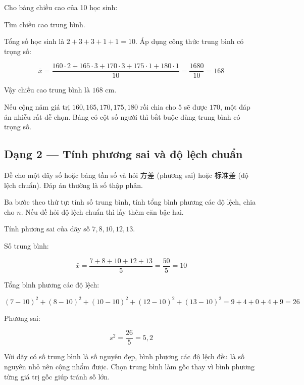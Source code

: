 \documentclass[11pt, a4paper]{article}
\begin{document}
\begin{vidu}[{1}]
Cho bảng chiều cao của 10 học sinh:


Tìm chiều cao trung bình.

Tổng số học sinh là $2 + 3 + 3 + 1 + 1 = 10$. Áp dụng công thức trung bình có trọng số:

$$\bar{x} = \frac{160 \cdot 2 + 165 \cdot 3 + 170 \cdot 3 + 175 \cdot 1 + 180 \cdot 1}{10} = \frac{1680}{10} = 168$$

Vậy chiều cao trung bình là $168$ cm.

 Nếu cộng năm giá trị $160, 165, 170, 175, 180$ rồi chia cho $5$ sẽ được $170$, một đáp án nhiễu rất dễ chọn. Bảng có cột số người thì bắt buộc dùng trung bình có trọng số.

\end{vidu}
\subsection{Dạng 2 — Tính phương sai và độ lệch chuẩn}

 Đề cho một dãy số hoặc bảng tần số và hỏi 方差 (phương sai) hoặc 标准差 (độ lệch chuẩn). Đáp án thường là số thập phân.

 Ba bước theo thứ tự: tính số trung bình, tính tổng bình phương các độ lệch, chia cho $n$. Nếu đề hỏi độ lệch chuẩn thì lấy thêm căn bậc hai.

\begin{vidu}[{2}]
Tính phương sai của dãy số $7, 8, 10, 12, 13$.

Số trung bình:

$$\bar{x} = \frac{7 + 8 + 10 + 12 + 13}{5} = \frac{50}{5} = 10$$

Tổng bình phương các độ lệch:

$$(7-10)^2 + (8-10)^2 + (10-10)^2 + (12-10)^2 + (13-10)^2 = 9 + 4 + 0 + 4 + 9 = 26$$

Phương sai:

$$s^2 = \frac{26}{5} = 5{,}2$$

 Với dãy có số trung bình là số nguyên đẹp, bình phương các độ lệch đều là số nguyên nhỏ nên cộng nhẩm được. Chọn trung bình làm gốc thay vì bình phương từng giá trị gốc giúp tránh số lớn.

\end{vidu}
\end{document}
